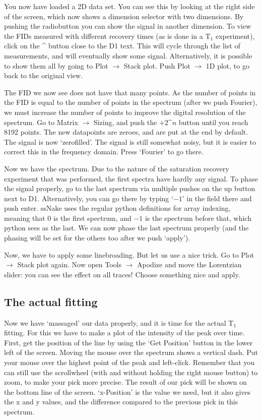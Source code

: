 \documentclass[11pt,a4paper]{article}
\begin{document}
You now have loaded a 2D data set. You can see this by looking at the right
side of the screen, which now shows a dimension selector with two dimensions.
By pushing the radiobutton you can show the signal in another dimension. To
view the FIDs measured with different recovery times (as is done in a T$_1$
experiment), click on the \^{} button close to the D1 text. This will cycle
through the list of measurements, and will eventually show some signal.
Alternatively, it is possible to show them all by going to Plot $\rightarrow$
Stack plot. Push Plot $\rightarrow$ 1D plot, to go back to the original view.

The FID we now see does not have that many points. As the number of points in
the FID is equal to the number of points in the spectrum (after we push
Fourier), we must increase the number of points to improve the digital
resolution of the spectrum. Go to Matrix $\rightarrow$ Sizing, and push the
$+2\text{\textasciicircum}n$ button until you reach 8192 points. The new
datapoints are zeroes, and are put at the end by default. The signal is now
`zerofilled'. The signal is still somewhat noisy, but it is easier to correct
this in the frequency domain. Press `Fourier' to go there.

Now we have the spectrum. Due to the nature of the saturation recovery
experiment that was performed, the first spectra have hardly any signal. To
phase the signal properly, go to the last spectrum via multiple pushes on the
up button next to D1. Alternatively, you can go there by typing `$-1$' in the
field there and push enter. ssNake uses the regular python definitions for
array indexing, meaning that 0 is the first spectrum, and $-1$ is the spectrum
before that, which python sees as the last. We can now phase the last spectrum
properly (and the phasing will be set for the others too after we push
`apply').

Now, we have to apply some linebroading. But let us use a nice trick. Go to
Plot $\rightarrow$ Stack plot again. Now open Tools $\rightarrow$ Apodize and
move the Lorentzian slider: you can see the effect on all traces! Choose
something nice and apply. 

\subsection{The actual fitting}
Now we have `massaged' our data properly, and it is time for the actual T$_1$ fitting. For this we
have to make a plot of the intensity of the peak over time. First, get the position of the line by
using the `Get Position' button in the lower left of the screen. Moving the mouse over the spectrum
shows a vertical dash. Put your mouse over the highest point of the peak and left-click. Remember
that you can still use the scrollwheel (with and without holding the right mouse button) to zoom, to
make your pick more precise. The result of our pick will be shown on the bottom line of the screen.
`x-Position' is the value we need, but it also gives the x and y values, and the difference compared
to the previous pick in this spectrum.
\end{document}
